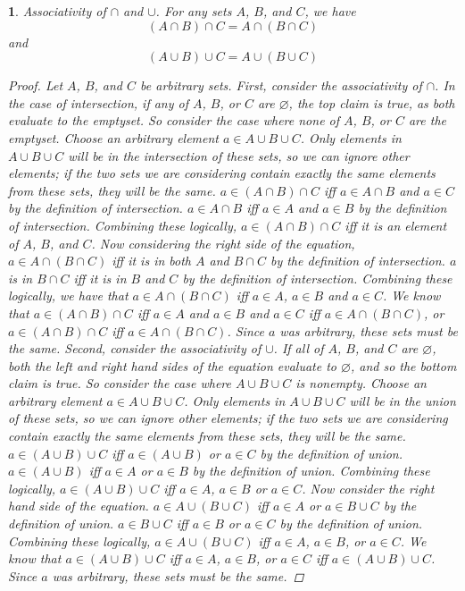 \documentclass{book}
\renewcommand{\emptyset}{\varnothing}
\newtheorem{majorEx}{}[section]
\begin{document}
            \begin{majorEx}%
            Associativity of $\cap$ and $\cup$. For any sets $A$, $B$, and $C$, we have $$(A \cap B) \cap C = A \cap (B \cap C)$$  and $$(A \cup B) \cup C = A \cup (B \cup C)$$
            \begin{proof}
            Let $A$, $B$, and $C$ be arbitrary sets. First, consider the associativity of $\cap$. In the case of intersection, if any of $A$, $B$, or $C$ are $\emptyset$, the top claim is true, as both evaluate to the emptyset. So consider the case where none of $A$, $B$, or $C$ are the emptyset. Choose an arbitrary element $a \in A \cup B \cup C$. Only elements in $A \cup B \cup C$ will be in the intersection of these sets, so we can ignore other elements; if the two sets we are considering contain exactly the same elements from these sets, they will be the same. $a \in (A \cap B) \cap C$ iff $a \in A \cap B$ and $a \in C$ by the definition of intersection. $a\in A \cap B$ iff $a \in A$ and $a \in B$ by the definition of intersection. Combining these logically, $a \in (A \cap B) \cap C$ iff it is an element of $A$, $B$, and $C$. Now considering the right side of the equation, $a \in A \cap (B \cap C)$ iff it is in both $A$ and $B \cap C$ by the definition of intersection. $a$ is in $B \cap C$ iff it is in $B$ and $C$ by the definition of intersection. Combining these logically, we have that $a \in A \cap (B \cap C)$ iff $a \in A$, $a \in B$ and $a \in C$. We know that $a \in (A \cap B) \cap C$ iff $a \in A$ and $a \in B$ and $a \in C$ iff $a \in A \cap (B \cap C)$, or $a \in (A \cap B) \cap C$ iff $a \in A \cap (B \cap C)$. Since $a$ was arbitrary, these sets must be the same. \newline
            Second, consider the associativity of $\cup$. If all of $A$, $B$, and $C$ are $\emptyset$, both the left and right hand sides of the equation evaluate to $\emptyset$, and so the bottom claim is true. So consider the case where $A \cup B \cup C$ is nonempty. Choose an arbitrary element $a \in A \cup B \cup C$. Only elements in $A \cup B \cup C$ will be in the union of these sets, so we can ignore other elements; if the two sets we are considering contain exactly the same elements from these sets, they will be the same. $a \in (A \cup B) \cup C$ iff $a \in (A \cup B)$ or $a \in C$ by the definition of union. $a \in (A \cup B)$ iff $a \in A$ or $a \in B$ by the definition of union. Combining these logically, $a \in (A \cup B) \cup C$ iff $a \in A$, $a \in B$ or $a \in C$. Now consider the right hand side of the equation. $a \in A \cup (B \cup C)$ iff $a \in A$ or $a \in B \cup C$ by the definition of union.  $a \in B \cup C$ iff $a \in B$ or $a \in C$ by the definition of union. Combining these logically, $a \in A \cup (B \cup C)$ iff $a \in A$, $a \in B$, or $a \in C$. We know that $a \in (A \cup B) \cup C$ iff $a \in A$, $a \in B$, or $a \in C$ iff $a \in (A \cup B) \cup C$. Since $a$ was arbitrary, these sets must be the same.
            \end{proof}
            \end{majorEx}
\end{document}
